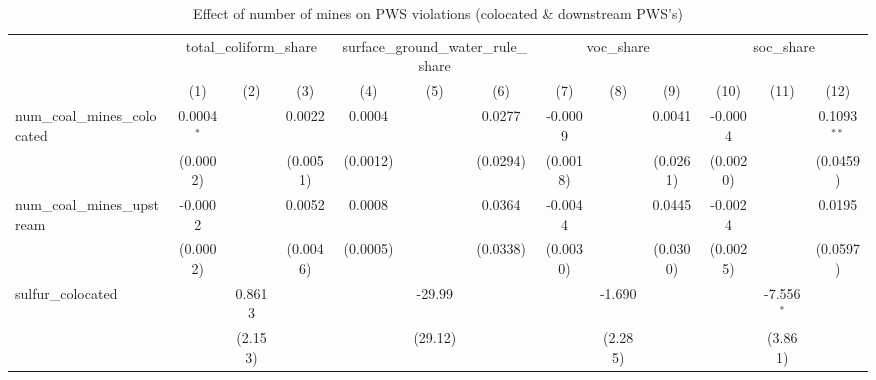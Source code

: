 
\begin{table}[htbp]
   \caption{\label{olsrf2sls_nummine_non_mine_vio_1985to2005allhucs_colocateddownstream} Effect of number of mines on PWS violations (colocated \& downstream PWS's)}
   \bigskip
   \centering
   \begin{adjustbox}{width = \textwidth, center}
      \begin{tabular}{lcccccccccccc}
         \toprule
          & \multicolumn{3}{c}{total\_coliform\_share} & \multicolumn{3}{c}{surface\_ground\_water\_rule\_share} & \multicolumn{3}{c}{voc\_share} & \multicolumn{3}{c}{soc\_share}\\
                                                            & (1)           & (2)           & (3)           & (4)           & (5)           & (6)           & (7)           & (8)           & (9)           & (10)          & (11)          & (12)\\  
         \midrule 
         num\_coal\_mines\_colocated                        & 0.0004$^{*}$  &               & 0.0022        & 0.0004        &               & 0.0277        & -0.0009       &               & 0.0041        & -0.0004       &               & 0.1093$^{**}$\\   
                                                            & (0.0002)      &               & (0.0051)      & (0.0012)      &               & (0.0294)      & (0.0018)      &               & (0.0261)      & (0.0020)      &               & (0.0459)\\   
         num\_coal\_mines\_upstream                         & -0.0002       &               & 0.0052        & 0.0008        &               & 0.0364        & -0.0044       &               & 0.0445        & -0.0024       &               & 0.0195\\   
                                                            & (0.0002)      &               & (0.0046)      & (0.0005)      &               & (0.0338)      & (0.0030)      &               & (0.0300)      & (0.0025)      &               & (0.0597)\\   
         sulfur\_colocated                                  &               & 0.8613        &               &               & -29.99        &               &               & -1.690        &               &               & -7.556$^{*}$  &   \\   
                                                            &               & (2.153)       &               &               & (29.12)       &               &               & (2.285)       &               &               & (3.861)       &   \\   

\end{tabular}
\end{adjustbox}
\end{table}
